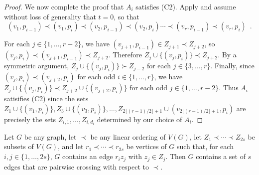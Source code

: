 \documentclass[kpfonts]{patmorin}
\begin{document}
\begin{proof}

We now complete the proof that $A_i$ satisfies (C2). Apply  and assume without loss of generality that $t=0$, so that
	\[
		(v_1,p_{i-1})\prec (v_1,p_{i}) \prec (v_2,p_{i-1}) \prec (v_2,p_{i}) \cdots \prec (v_r,p_{i-1}) \prec (v_r,p_{i}) \enspace .
	\]

    For each $j\in\{1,\ldots,r-2\}$, we have $(v_{j+1},p_{i-1})\in Z_{j+1}\prec Z_{j+2}$, so  $(v_j,p_i)\prec (v_{j+1},p_{i-1}) \prec Z_{j+2}$.  Therefore $Z_j\cup\{(v_j,p_i)\} \prec Z_{j+2}$.  By a symmetric argument, $Z_j\cup\{(v_j,p_i)\} \succ Z_{j-2}$ for each  $j\in\{3,\ldots,r\}$.  Finally, since $(v_{j},p_i)\prec (v_{j+2},p_i)$ for each odd $i\in\{1,\ldots,r\}$, we have $Z_{j}\cup\{(v_j,p_i)\} \prec Z_{j+2}\cup\{(v_{j+2},p_i)\}$ for each odd $j\in\{1,\ldots,r-2\}$.  Thus $A_i$ satisifies (C2) since the sets $Z_1\cup\{(v_1,p_i)\},Z_3\cup\{(v_3,p_i)\},\ldots,Z_{2\lfloor (r-1)/2\rfloor+1} \cup (v_{2\lfloor (r-1)/2\rfloor+1},p_i)$ are precisely the sets $Z_{i,1},\ldots,Z_{i,d_i}$ determined by our choice of $A_i$.
\end{proof}

\begin{lem}
    Let $G$ be any graph, let $\prec$ be any linear ordering of $V(G)$,  let $Z_{1}\prec\cdots\prec Z_{2s}$ be subsets of $V(G)$, and let $r_1\prec\cdots\prec r_{2s}$ be vertices of $G$ such that, for each $i,j\in\{1,\ldots,2s\}$, $G$ contains an edge $r_iz_j$ with $z_j\in Z_j$. Then $G$ contains a set of $s$ edges that are pairwise crossing with respect to $\prec$. 
\end{lem}
\end{document}
